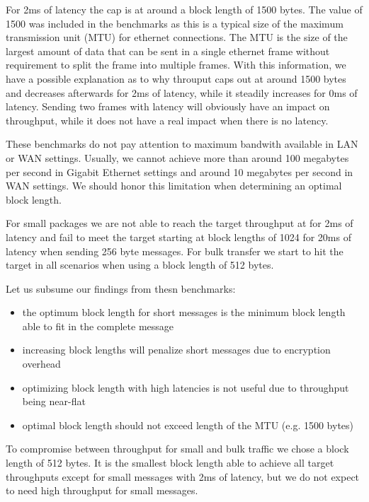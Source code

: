For 2ms of latency the cap is at around a block length of 1500 bytes.
The value of 1500 was included in the benchmarks as this is a typical size of the maximum transmission unit (MTU) for ethernet connections.
The MTU is the size of the largest amount of data that can be sent in a single ethernet frame without requirement to split the frame into multiple frames.
With this information, we have a possible explanation as to why throuput caps out at around 1500 bytes and decreases afterwards for 2ms of latency, while it steadily increases for 0ms of latency.
Sending two frames with latency will obviously have an impact on throughput, while it does not have a real impact when there is no latency.

\medskip

These benchmarks do not pay attention to maximum bandwith available in LAN or WAN settings.
Usually, we cannot achieve more than around 100 megabytes per second in Gigabit Ethernet settings and around 10 megabytes per second in WAN settings.
We should honor this limitation when determining an optimal block length.

For small packages we are not able to reach the target throughput at for 2ms of latency and fail to meet the target starting at block lengths of 1024 for 20ms of latency when sending 256 byte messages.
For bulk transfer we start to hit the target in all scenarios when using a block length of 512 bytes.

\medskip

Let us subsume our findings from thesn benchmarks:
\begin{itemize}
    \item the optimum block length for short messages is the minimum block length able to fit in the complete message
    \item increasing block lengths will penalize short messages due to encryption overhead
    \item optimizing block length with high latencies is not useful due to throughput being near-flat
    \item optimal block length should not exceed length of the MTU (e.g. 1500 bytes)
\end{itemize}

To compromise between throughput for small and bulk traffic we chose a block length of 512 bytes.
It is the smallest block length able to achieve all target throughputs except for small messages with 2ms of latency, but we do not expect to need high throughput for small messages.

